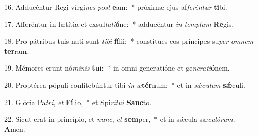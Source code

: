 16. Adducéntur Regi vírgi\textit{nes} \textit{post} \textbf{e}am:~*  próximæ ejus af\textit{fe}\textit{rén}\textit{tur} \textbf{ti}bi.\

17. Afferéntur in lætítia et exsul\textit{ta}\textit{ti}\textbf{ó}ne:~*  adducéntur \textit{in} \textit{tem}\textit{plum} \textbf{Re}gis.\

18. Pro pátribus tuis nati sunt \textit{ti}\textit{bi} \textbf{fí}lii:~*  constítues eos príncipes su\textit{per} \textit{om}\textit{nem} \textbf{ter}ram.\

19. Mémores erunt nó\textit{mi}\textit{nis} \textbf{tu}i:~*  in omni generatióne et ge\textit{ne}\textit{ra}\textit{ti}\textbf{ó}nem.\

20. Proptérea pópuli confitebúntur tibi \textit{in} \textit{æ}\textbf{tér}num:~*  et in \textit{sǽ}\textit{cu}\textit{lum} \textbf{sǽ}culi.\

21. Glória Pa\textit{tri}, \textit{et} \textbf{Fí}lio,~*  et Spi\textit{rí}\textit{tu}\textit{i} \textbf{Sanc}to.\

22. Sicut erat in princípio, et \textit{nunc}, \textit{et} \textbf{sem}per,~*  et in sǽcula sæ\textit{cu}\textit{ló}\textit{rum}. \textbf{A}men.\

